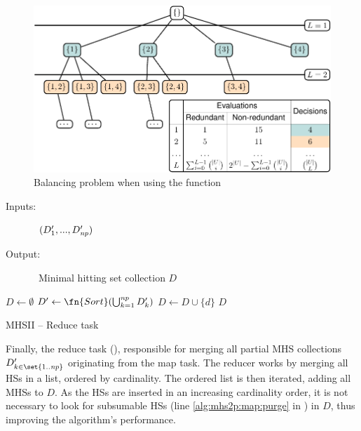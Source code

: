 \begin{figure}[!ht]
  \includegraphics[page=4]{figures/mhs2/figures/parallel/main}
  \caption{Balancing problem when using the \strideFn{} function\label{fig:mhs2p:stride-balancing}}
\end{figure}


\begin{algorithm*}
  \begin{description}
  \item[Inputs:]\ $(D'_1, ..., D'_{\mathit{np}})$
  \item[Output:]\ Minimal hitting set collection $D$
  \end{description}
  \begin{algorithmic}[1]
    \State $D \gets \emptyset$
    \State $D' \gets \fn{Sort}(\bigcup^{\nproc}_{k=1} D'_k)$
    \label{alg:reduce:isminimal}
    \State $D \gets D \cup \{d\}$
    \EndIf
    \EndFor
    \State \Return $D$
  \end{algorithmic}
  \caption{\acs{MHSII} -- Reduce task}
  \label{alg:mhs2p:reduce}
\end{algorithm*}


Finally, the reduce task (), responsible for
merging all partial \ac{MHS} collections $D'_{k\in\set{1..\nproc}}$
originating from the map task.
%
The reducer works by merging all \acp{HS} in a list, ordered by
cardinality.
%
The ordered list is then iterated, adding all \acp{MHS} to $D$.
%
As the \acp{HS} are inserted in an increasing cardinality order, it is
not necessary to look for subsumable \acp{HS} (line
\ref{alg:mhs2p:map:purge} in ) in $D$, thus
improving the algorithm's performance.
